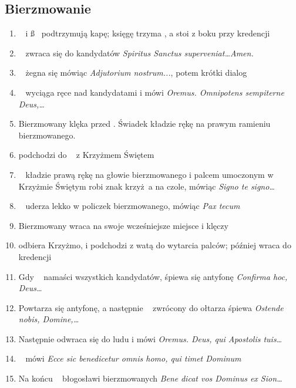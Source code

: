 \subsection{Bierzmowanie}
\label{sec:bierz}
\begin{enumerate}
      \item \dd~ i \ss~ podtrzymują kapę; księgę trzyma , a  stoi z boku
            przy kredencji
      \item \ii~ zwraca się do kandydatów \textit{Spiritus
                  Sanctus superveniat\dots Amen.}
      \item \ii~ żegna się mówiąc \textit{Adjutorium nostrum...}, potem krótki
            dialog
      \item \ii~ wyciąga ręce nad kandydatami i mówi
            \textit{Oremus. Omnipotens sempiterne Deus,\dots}
      \item Bierzmowany klęka przed \ii. Świadek kładzie rękę na
            prawym ramieniu bierzmowanego.
      \item {} podchodzi do \dd~ z Krzyżmem Świętem
      \item \ii~ kładzie prawą rękę na głowie bierzmowanego i palcem umoczonym w
            Krzyżmie Świętym robi znak krzyż a na czole, mówiąc \textit{Signo te
                  signo\dots}
      \item \ii~ uderza lekko w policzek bierzmowanego, mówiąc \textit{Pax tecum}
      \item Bierzmowany wraca na swoje wcześniejsze miejsce i klęczy
      \item {} odbiera Krzyżmo, i podchodzi z watą do wytarcia palców; później
            wraca do kredencji
      \item Gdy \ii~ namaści wszystkich kandydatów, śpiewa się antyfonę
            \textit{Confirma hoc, Deus\dots}
      \item Powtarza się antyfonę, a następnie \ii~ zwrócony do ołtarza śpiewa
            \textit{Ostende nobis, Domine,\dots}
      \item Następnie odwraca się do ludu i mówi \textit{Oremus. Deus, qui
                  Apostolis tuis\dots}
      \item \ii~ mówi \textit{Ecce sic benedicetur omnis homo, qui timet Dominum}
      \item Na końcu \ii~ błogosławi bierzmowanych
            \textit{Bene} \textcolor{red}{}
            \textit{dicat vos Dominus ex Sion\dots}
\end{enumerate}

